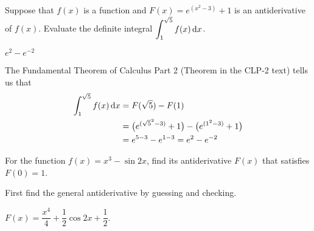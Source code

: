 %
%

\subsection*{\Conceptual}

\begin{question}[2016Q2]
Suppose that $f(x)$ is a function and $F(x) = e^{(x^2-3)} + 1$ is an antiderivative of $f(x)$. Evaluate the definite integral $\displaystyle\int_1^{\sqrt5} f(x)\,\mathrm{d}x$.
\end{question}


\begin{answer}
$e^2-e^{-2}$
\end{answer}

\begin{solution}
The Fundamental Theorem of Calculus Part 2 (Theorem 
 in the CLP-2 text) tells us that
\begin{align*}
\int_1^{\sqrt5} f(x)\,\mathrm{d}x &= F(\sqrt5) - F(1) \\
&= \big( e^{(\sqrt5^2-3)} + 1 \big) - \big( e^{(1^2-3)} + 1 \big) \\
&= e^{5-3} - e^{1-3} = e^2-e^{-2}
\end{align*}
\end{solution}

\begin{question}[M105 2015A]
For the function $f(x) = x^3 -\sin 2x$, find its antiderivative $F(x)$ that
satisfies $F(0)=1$.
\end{question}

\begin{hint}
First find the general antiderivative by guessing and checking.
\end{hint}

\begin{answer}
$F(x) = \dfrac{x^4}{4}+\dfrac{1}{2}\cos 2x+\dfrac{1}{2}$.
\end{answer}

